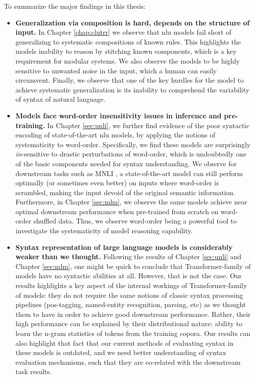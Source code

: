 \documentclass[letterpaper, 12pt]{report}
\begin{document}
To summarize the major findings in this thesis:

\begin{itemize}
  \item \textbf{Generalization via composition is hard, depends on the structure of input.} In Chapter \autoref{chap:clutrr} we observe that \acrshort{nlu} models fail short of generalizing to systematic compositions of known rules. This highlights the models inability to reason by stitching known components, which is a key requirement for modular systems. We also observe the models to be highly sensitive to unwanted noise in the input, which a human can easily circumvent. Finally, we observe that one of the key hurdles for the model to achieve systematic generalization is its inability to comprehend the variability of syntax of natural language.

  \item \textbf{Models face word-order insensitivity issues in inference and pre-training.} In Chapter \autoref{sec:unli}, we further find evidence of the poor syntactic encoding of state-of-the-art \acrshort{nlu} models, by applying the notions of systematicity to word-order. Specifically, we find these models are surprisingly \textit{in}-sensitive to drastic perturbations of word-order, which is undoubtedly one of the basic components needed for syntax understanding. We observe for downstream tasks such as MNLI \citep{williams2017broad}, a state-of-the-art model can still perform optimally (or sometimes even better) on inputs where word-order is scrambled, making the input devoid of the original semantic information. Furthermore, in Chapter \autoref{sec:mlm}, we observe the same models achieve near optimal downstream performance when pre-trained from scratch on word-order shuffled data. Thus, we observe word-order being a powerful tool to investigate the systematicity of model reasoning capability.

  \item \textbf{Syntax representation of large language models is considerably weaker than we thought.} Following the results of Chapter \autoref{sec:unli} and Chapter \autoref{sec:mlm}, one might be quick to conclude that Transformer-family of models have no syntactic abilities at all. However, that is not the case. Our results highlights a key aspect of the internal workings of Transformer-family of models: they do not require the same notions of classic syntax processing pipelines (pos-tagging, named-entity recognition, parsing, etc) as we thought them to have in order to achieve good downstream performance. Rather, their high performance can be explained by their distributional nature: ability to learn the n-gram statistics of tokens from the training copora. Our results can also highlight that fact that our current methods of evaluating syntax in these models is outdated, and we need better understanding of syntax evaluation mechanisms, such that they are co-related with the downstream task results.


\end{itemize}
\end{document}
